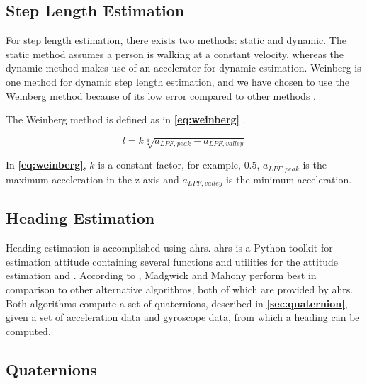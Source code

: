 
\subsection{Step Length Estimation}

For step length estimation, there exists two methods: static and dynamic. The static method assumes a person is walking at a constant velocity, whereas the dynamic method makes use of an accelerator for dynamic estimation. Weinberg is one method for dynamic step length estimation, and we have chosen to use the Weinberg method because of its low error compared to other methods \cite{HybridPositioningPaper}.

The Weinberg method is defined as in \textbf{\autoref{eq:weinberg}} \cite{weinberg}.

\begin{equation} \label{eq:weinberg}
    l = k \sqrt[4]{a_{LPF, peak} - a_{LPF, valley}}
\end{equation}

In \textbf{\autoref{eq:weinberg}}, $k$ is a constant factor, for example, $0.5$, $a_{LPF, peak}$ is the maximum acceleration in the z-axis and $a_{LPF, valley}$ is the minimum acceleration. 

\subsection{Heading Estimation}
Heading estimation is accomplished using \gls{ahrs}. \gls{ahrs} is a Python toolkit for estimation attitude containing several functions and utilities for the attitude estimation\cite{ahrs} and \cite{FastAHRS}. According to \cite{MultisensorComparison}, Madgwick and Mahony perform best in comparison to other alternative algorithms, both of which are provided by \gls{ahrs}. Both algorithms compute a set of quaternions, described in \textbf{\autoref{sec:quaternion}}, given a set of acceleration data and gyroscope data, from which a heading can be computed.

\subsection{Quaternions} \label{sec:quaternion}